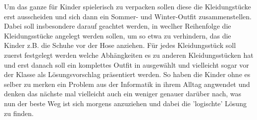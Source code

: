 Um das ganze für Kinder spielerisch zu verpacken sollen diese die Kleidungstücke erst ausscheiden und sich dann ein Sommer- und Winter-Outfit zusammenstellen. Dabei soll insbesondere darauf geachtet werden, in weclher Reihenfolge die Kleidungsstücke angelegt werden sollen, um so etwa zu verhindern, das die Kinder z.B. die Schuhe vor der Hose anziehen. Für jedes Kleidungsstück soll zuerst festgelegt werden welche Abhängkeiten es zu anderen Kleidungsstücken hat und erst danach soll ein komplettes Outfit in ausgewählt und vielleicht sogar vor der Klasse als Lösungsvorschlag präsentiert werden. So haben die Kinder ohne es selber zu merken ein Problem aus der Informatik in ihrem Alltag angwendet und denken das nächste mal vielleicht auch ein weniger genauer darüber nach, was nun der beste Weg ist sich morgens anzuziehen und dabei die 'logischte' Lösung zu finden.